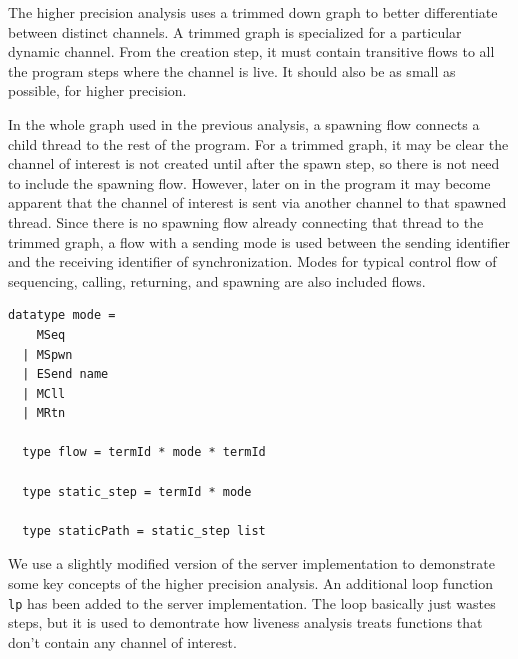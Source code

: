 \documentclass[letterpaper, 11pt]{extarticle}
\begin{document}
The higher precision analysis uses a trimmed down graph to better differentiate between distinct channels. 
A trimmed graph is specialized for a particular dynamic channel. From the creation
step, it must contain transitive flows to all the program steps where the
channel is live. It should also be as small as possible, for higher precision.

In the whole graph used in the previous analysis, a spawning flow
connects a child thread to the rest of the program. For a trimmed graph,
it may be clear the channel of interest is not created until after the spawn step,
so there is not need to include the spawning flow. However, later on in the
program it may become apparent that the channel of interest is sent via another channel to
that spawned thread. Since there is no spawning flow already connecting that
thread to the trimmed graph, a flow with a sending mode is used between the
sending identifier and the receiving identifier of synchronization.
Modes for typical control flow of
sequencing, calling, returning, and spawning are also included flows.

\begin{lstlisting}[language=logic, mathescape]
  datatype mode =
    MSeq
  | MSpwn
  | ESend name
  | MCll
  | MRtn

  type flow = termId * mode * termId

  type static_step = termId * mode

  type staticPath = static_step list
\end{lstlisting}

We use a slightly modified version of the server implementation
to demonstrate some key concepts of the higher precision analysis.
An additional loop function \lstinline{lp} has been added to the
server implementation. The loop basically just wastes steps, but it is used to demontrate how
liveness analysis treats functions that don't contain any channel of interest.
\end{document}

